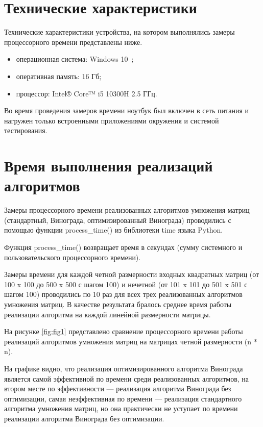 \clearpage

\section{Технические характеристики}

Технические характеристики устройства, на котором выполнялись замеры процессорного времени представлены ниже.

\begin{itemize}
	\item операционная система: Windows 10~\cite{windows10};
	\item оперативная память: 16 Гб;
	\item процессор: Intel® Core™ i5 10300H 2.5 ГГц.
\end{itemize}

Во время проведения замеров времени ноутбук был включен в сеть питания и нагружен только встроенными приложениями окружения и системой тестирования.

\section{Время выполнения реализаций алгоритмов}

Замеры процессорного времени реализованных алгоритмов умножения матриц (стандартный, Винограда, оптимизированный Винограда) проводились с помощью функции process\_time() из библиотеки time языка Python. 

Функция process\_time() возвращает время в секундах (сумму системного и пользовательского процессорного времени).

Замеры времени для каждой четной размерности входных квадратных матриц (от 100 x 100 до 500 x 500 с шагом 100) и нечетной (от 101 x 101 до 501 x 501 с шагом 100) проводились по 10 раз для всех трех реализованных алгоритмов умножения матриц. В качестве результата бралось среднее время работы реализации алгоритма на каждой линейной размерности матрицы.


На рисунке \ref{fig:fig1} представлено сравнение процессорного времени работы реализаций алгоритмов умножения матриц на матрицах четной размерности (n * n).

На графике видно, что реализация оптимизированного алгоритма Винограда является самой эффективной по времени среди реализованных алгоритмов, на втором месте по эффективности --- реализация алгоритма Винограда без оптимизации, самая неэффективная по времени --- реализация стандартного алгоритма умножения матриц, но она практически не уступает по времени реализации алгоритма Винограда без оптимизации.

